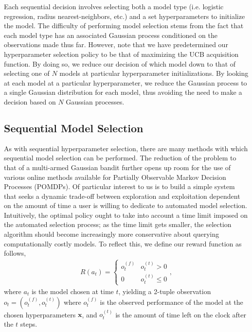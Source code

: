 \documentclass{article}
\newcommand{\x}{\mathbf{x}}
\begin{document}
Each sequential decision involves selecting both a model type (i.e. logistic regression, radius nearest-neighbors, etc.) and a set hyperparameters to initialize the model. The difficulty of performing model selection stems from the fact that each model type has an associated Gaussian process conditioned on the observations made thus far. However, note that we have predetermined our hyperparameter selection policy to be that of maximizing the UCB acquisition function. By doing so, we reduce our decision of which model down to that of selecting one of $N$ models at particular hyperparameter initializations. By looking at each model at a particular hyperparameter, we reduce the Gaussian process to a single Gaussian distribution for each model, thus avoiding the need to make a decision based on $N$ Gaussian processes.

\subsection{Sequential Model Selection}
As with sequential hyperparameter selection, there are many methods with which sequential model selection can be performed. The reduction of the problem to that of a multi-armed Gaussian bandit further opens up room for the use of various online methods available for Partially Observable Markov Decision Processes (POMDPs). Of particular interest to us is to build a simple system that seeks a dynamic trade-off between exploration and exploitation dependent on the amount of time a user is willing to dedicate to automated model selection. Intuitively, the optimal policy ought to take into account a time limit imposed on the automated selection process; as the time limit gets smaller, the selection algorithm should become increasingly more conservative about querying computationally costly models. To reflect this, we define our reward function as follows,
\begin{align}
  R(a_t) =
  \begin{cases}
    o_t^{(f)} & o^{(t)}_t > 0 \\
    0 & o_t^{(t)} \le 0 
  \end{cases},
\end{align}
where $a_t$ is the model chosen at time $t$, yielding a 2-tuple observation $o_t = (o_t^{(f)}, o_t^{(t)})$ where $o_t^{(f)}$ is the observed performance of the model at the chosen hyperparameters $\x$, and $o_t^{(t)}$ is the amount of time left on the clock after the $t$ steps.
\end{document}

